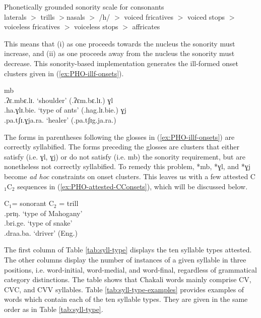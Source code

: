 \begin{exe}
\ex\label{ex:sonority-slope}{{\rm Phonetically grounded sonority scale for
consonants   \citep[236]{Park02}}}\\
 laterals $>$
trills $>$nasals $>$ /h/ $>$ voiced fricatives $>$ voiced stops $>$ voiceless
fricatives $>$ voiceless stops $>$ affricates
\end{exe}

This means that  (i) as one
proceeds towards the nucleus the sonority must increase, and (ii) as one 
proceeds away from the nucleus the sonority must  decrease.   This 
sonority-based implementation  generates the ill-formed onset clusters
given in (\ref{ex:PHO-illf-onsets}).  


\begin{exe}
\ex\label{ex:PHO-illf-onsets}
\begin{xlist}
\ex *mb \\
 .ʔɛ.mbɛ.lɪ.		{\rm `shoulder'}    (.ʔɛm.bɛ.lɪ.)
\ex *ɣl\\
 .ha.ɣlɪ.bie.		{\rm`type of ants'}   (.hag.lɪ.bie.)	
\ex *ɣj\\
 .pa.tʃɪ.ɣja.ra.	{\rm`healer'}  (.pa.tʃɪg.ja.ra.)


\end{xlist}
\end{exe}

The forms in parentheses following the glosses in  (\ref{ex:PHO-illf-onsets}) 
are correctly 
syllabified. The forms preceding the glosses are clusters that either satisfy 
(i.e. ɣl, ɣj) or do not satisfy  (i.e. mb)  the sonority requirement, but are 
nonetheless not correctly syllabified. To remedy  this problem,   *mb, *ɣl,  and 
*ɣj  become {\it ad hoc} constraints on onset clusters. This leaves us with a few
attested C$_{1}$C$_{2}$ sequences in (\ref{ex:PHO-attested-CConsets}), which 
will be discussed below.  


\begin{exe}
\ex\label{ex:PHO-attested-CConsets}{C$_{1}$= {\sc sonorant} C$_{2}$ = {\sc
trill}}\\ 
.prɪŋ.	  	{\rm `type of Mahogany'} \\
.bri.ge.	 		{\rm   `type of snake'} \\
	.draa.ba.		{\rm   `driver'  (Eng.)}\\
\end{exe}


The first column of Table   \ref{tab:syll-type} displays the ten syllable types
attested.  The other columns display the number of instances of a given
syllable in three positions, i.e.  word-initial, word-medial, and word-final, 
regardless of  grammatical category distinctions. The table shows that Chakali 
words  mainly comprise CV, CVC, and CVV syllables. Table 
\ref{tab:syll-type-examples} provides examples of words which contain each of 
the ten syllable types. They are given in the same order as in Table 
\ref{tab:syll-type}.  


